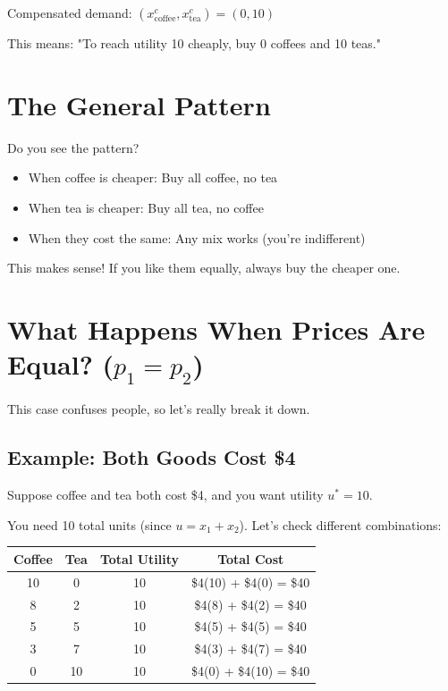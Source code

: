 \documentclass[11pt]{article}
\begin{document}
\begin{tcolorbox}[colback=yellow!10!white,colframe=orange!75!black,title=The Answer for Example 2]
Compensated demand: $(x_{\text{coffee}}^c, x_{\text{tea}}^c) = (0, 10)$

This means: "To reach utility 10 cheaply, buy 0 coffees and 10 teas."
\end{tcolorbox}

\section{The General Pattern}

Do you see the pattern?

\begin{itemize}
\item When coffee is cheaper: Buy all coffee, no tea
\item When tea is cheaper: Buy all tea, no coffee
\item When they cost the same: Any mix works (you're indifferent)
\end{itemize}

This makes sense! If you like them equally, always buy the cheaper one.

\section{What Happens When Prices Are Equal? ($p_1 = p_2$)}

This case confuses people, so let's really break it down.

\subsection{Example: Both Goods Cost \$4}

Suppose coffee and tea both cost \$4, and you want utility $u^* = 10$.

You need 10 total units (since $u = x_1 + x_2$). Let's check different combinations:

\begin{center}
\begin{tabular}{|c|c|c|c|}
\hline
Coffee & Tea & Total Utility & Total Cost \\
\hline
10 & 0 & 10 & \$4(10) + \$4(0) = \$40 \\
8 & 2 & 10 & \$4(8) + \$4(2) = \$40 \\
5 & 5 & 10 & \$4(5) + \$4(5) = \$40 \\
3 & 7 & 10 & \$4(3) + \$4(7) = \$40 \\
0 & 10 & 10 & \$4(0) + \$4(10) = \$40 \\
\hline
\end{tabular}
\end{center}
\end{document}
